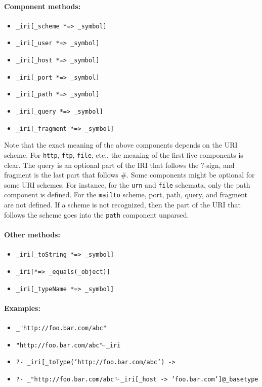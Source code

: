 \documentclass[11pt]{article}
\begin{document}
\paragraph{Component methods:}
\begin{itemize}
\item
  {\tt \_iri[\_scheme *=> \_symbol]}
\item
  {\tt \_iri[\_user *=> \_symbol]}
\item
  {\tt \_iri[\_host *=> \_symbol]}
\item
  {\tt \_iri[\_port *=> \_symbol]}
\item
  {\tt \_iri[\_path *=> \_symbol]}
\item
  {\tt \_iri[\_query *=> \_symbol]}
\item
  {\tt \_iri[\_fragment *=> \_symbol]}
\end{itemize}
Note that the exact meaning of the above components depends on the URI
scheme. For {\tt http}, {\tt ftp}, {\tt file}, etc., the meaning of
the first five components is clear. The query is an optional part of the
IRI that follows the ?-sign, and fragment is the last part that
follows \#.  Some components might be optional for some URI
schemes.  For instance, for the {\tt urn}  and {\tt file}  schemata,
only the path component is defined.  For the {\tt mailto}  scheme, port,
path, query, and fragment are not defined.  If a scheme is not recognized,
then the part of the URI that follows the scheme goes into the
{\tt path}  component unparsed.

\paragraph{Other methods:}
\begin{itemize}
\item  {\tt \_iri[\_toString *=> \_symbol]}  
\item  {\tt \_iri[*=> \_equals(\_object)]}   
\item  {\tt \_iri[\_typeName *=> \_symbol]}   
\end{itemize}

\paragraph{Examples:}
\begin{itemize}
\item      {\tt \_"http://foo.bar.com/abc"} 
\item      {\tt "http://foo.bar.com/abc"$\hat{~}\hat{~}$\_iri} 
\item      {\tt ?- \_iri[\_toType('http://foo.bar.com/abc') ->}\\
  \hspace*{5cm}{\tt "http://foo.bar.com/abc"$\hat{~}\hat{~}$\_iri]@\_basetype}  
\item      {\tt ?- \_"http://foo.bar.com/abc"$\hat{~}\hat{~}$\_iri[\_host -> 'foo.bar.com']@\_basetype}  
\end{itemize}
\end{document}
